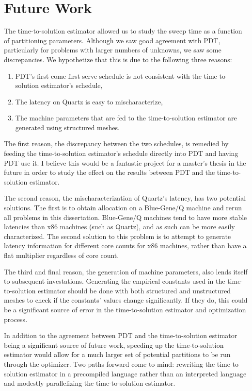 \section{Future Work}

The time-to-solution estimator allowed us to study the sweep time as a function of partitioning parameters.
Although we saw good agreement with PDT, particularly for problems with larger numbers of unknowns, we saw some discrepancies.
We hypothetize that this is due to the following three reasons:
\begin{enumerate}
\item PDT's first-come-first-serve schedule is not consistent with the time-to-solution estimator's schedule,
\item The latency on Quartz is easy to mischaracterize,
\item The machine parameters that are fed to the time-to-solution estimator are generated using structured meshes.
\end{enumerate}

The first reason, the discrepancy between the two schedules, is remedied  by feeding the time-to-solution estimator's schedule directly into PDT and having PDT use it.
I believe this would be a fantastic project for a master's thesis in the future in order to study the effect on the results between PDT and the time-to-solution estimator.

The second reason, the mischaracterization of Quartz's latency, has two potential solutions.
The first is to obtain allocation on a Blue-Gene/Q machine and rerun all problems in this dissertation.
Blue-Gene/Q machines tend to have more stable latencies than x86 machines (such as Quartz), and as such can be more easily characterized.
The second solution to this problem is to attempt to generate latency information for different core counts for x86 machines, rather than have a flat multiplier regardless of core count.

The third and final reason, the generation of machine parameters, also lends itself to subsequent investations.
Generating the empirical constants used in the time-to-solution estimator should be done with both structured and unstructured meshes to check if the constants' values change significantly.
If they do, this could be a significant source of error in the time-to-solution estimator and optimization process.

In addition to the agreement between PDT and the time-to-solution estimator being a significant source of future work, speeding up the time-to-solution estimator would allow for a much larger set of potential partitions to be run through the optimizer.
Two paths forward come to mind: rewriting the time-to-solution estimator in a precompiled language rather than an interpreted language and modestly parallelizing the time-to-solution estimator.

